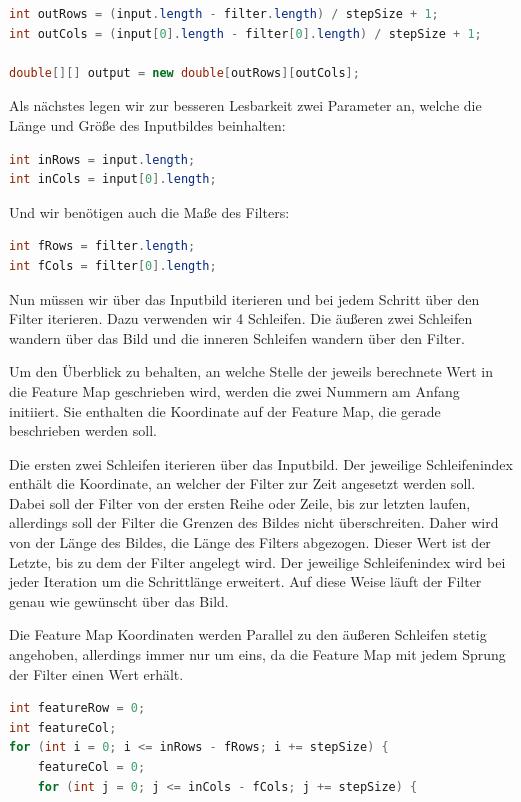 \documentclass[12pt]{article}
\begin{document}
\begin{lstlisting}[language=Java]
int outRows = (input.length - filter.length) / stepSize + 1;
int outCols = (input[0].length - filter[0].length) / stepSize + 1;

double[][] output = new double[outRows][outCols];
\end{lstlisting}

Als nächstes legen wir zur besseren Lesbarkeit zwei Parameter an, welche die Länge und Größe des Inputbildes beinhalten:

\begin{lstlisting}[language=Java]
int inRows = input.length;
int inCols = input[0].length;
\end{lstlisting}

Und wir benötigen auch die Maße des Filters:

\begin{lstlisting}[language=Java]
int fRows = filter.length;
int fCols = filter[0].length;
\end{lstlisting}

Nun müssen wir über das Inputbild iterieren und bei jedem Schritt über den Filter iterieren. Dazu verwenden wir 4 Schleifen. Die äußeren zwei Schleifen wandern über das Bild und die inneren Schleifen wandern über den Filter. 

Um den Überblick zu behalten, an welche Stelle der jeweils berechnete Wert in die Feature Map geschrieben wird, werden die zwei Nummern am Anfang initiiert. Sie enthalten die Koordinate auf der Feature Map, die gerade beschrieben werden soll.

Die ersten zwei Schleifen iterieren über das Inputbild. Der jeweilige Schleifenindex enthält die Koordinate, an welcher der Filter zur Zeit angesetzt werden soll. Dabei soll der Filter von der ersten Reihe oder Zeile, bis zur letzten laufen, allerdings soll der Filter die Grenzen des Bildes nicht überschreiten. Daher wird von der Länge des Bildes, die Länge des Filters abgezogen. Dieser Wert ist der Letzte, bis zu dem der Filter angelegt wird. Der jeweilige Schleifenindex wird bei jeder Iteration um die Schrittlänge erweitert. Auf diese Weise läuft der Filter genau wie gewünscht über das Bild.

Die Feature Map Koordinaten werden Parallel zu den äußeren Schleifen stetig angehoben, allerdings immer nur um eins, da die Feature Map mit jedem Sprung der Filter einen Wert erhält.

\begin{lstlisting}[language=Java]
int featureRow = 0;
int featureCol;
for (int i = 0; i <= inRows - fRows; i += stepSize) {
    featureCol = 0;
    for (int j = 0; j <= inCols - fCols; j += stepSize) {
\end{lstlisting}
\end{document}
